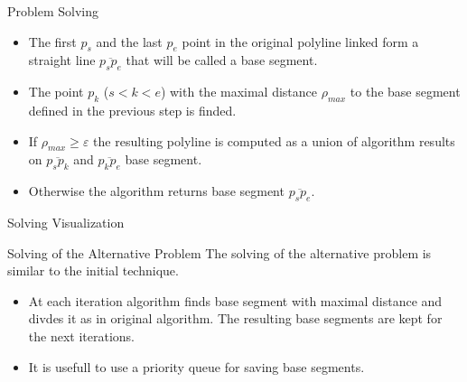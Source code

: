 \documentclass[10pt]{beamer}
\begin{document}
\begin{frame}{Problem Solving}
	\begin{itemize}
		\item %
			  The first $p_{s}$ and the last $p_{e}$ point  in the original polyline 
			  linked form a straight line $\overline{p_sp_e}$ that will be called a \alert{base segment}.		
		\item %
			  The point $p_k$ ($s <  k < e$) with the maximal distance $\rho_{max}$ 
			  to the base segment defined in the previous step is finded. 
		\item %
		      If $\rho_{max} \geq \varepsilon$ the resulting polyline is computed 
		      as a union of algorithm results on $\overline{p_{s}p_k}$ 
		      and $\overline{p_kp_{e}}$   base segment.
		\item %
			  Otherwise the algorithm returns base segment $\overline{p_sp_e}$.
	\end{itemize}
\end{frame}

\begin{frame}{Solving Visualization}
\end{frame}

\begin{frame}{Solving of the Alternative Problem}
	The solving of the alternative problem is similar to the initial technique.
	\begin{itemize}
		\item At each iteration algorithm finds base segment with maximal distance
		and divdes it as in original algorithm. The resulting base segments are kept
		for the next iterations.
		\item It is usefull to use a priority queue for saving base segments.  
	\end{itemize}
	
\end{frame}
\end{document}
